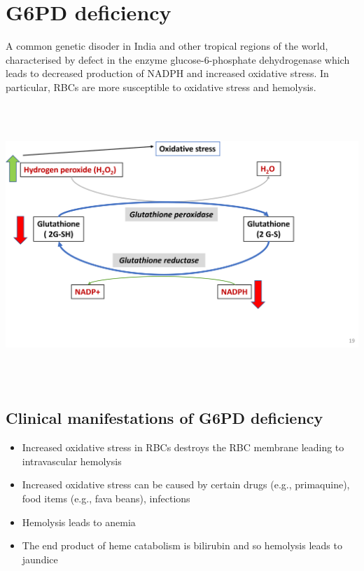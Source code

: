 \documentclass[
]{book}
\begin{document}
\section{G6PD deficiency}\label{g6pd-deficiency}

A common genetic disoder in India and other tropical regions of the world, characterised by defect in the enzyme glucose-6-phosphate dehydrogenase which leads to decreased production of NADPH and increased oxidative stress. In particular, RBCs are more susceptible to oxidative stress and hemolysis.

\includegraphics[width=\textwidth,height=4.16667in]{Images/G6PD.png}

\subsection{Clinical manifestations of G6PD deficiency}\label{clinical-manifestations-of-g6pd-deficiency}

\begin{itemize}
\item
  Increased oxidative stress in RBCs destroys the RBC membrane leading to intravascular hemolysis
\item
  Increased oxidative stress can be caused by certain drugs (e.g., primaquine), food items (e.g., fava beans), infections
\item
  Hemolysis leads to anemia
\item
  The end product of heme catabolism is bilirubin and so hemolysis leads to jaundice
\end{itemize}
\end{document}
